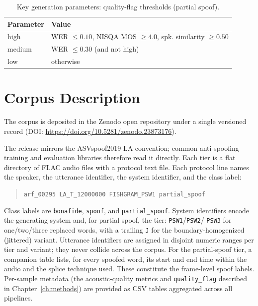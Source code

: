 \documentclass[11pt]{report}
\begin{document}
\begin{table}[H]
\centering
\caption{Key generation parameters: quality-flag thresholds (partial spoof).}
\label{tab:params-quality}
\small
\begin{tabular}{p{4.9cm}p{7.2cm}}
\toprule
\textbf{Parameter} & \textbf{Value} \\
\midrule
high & WER $\leq 0.10$, NISQA MOS $\geq 4.0$, spk. similarity $\geq 0.50$ \\
medium & WER $\leq 0.30$ (and not high) \\
low & otherwise \\
\bottomrule
\end{tabular}
\end{table}

\chapter{Corpus Description}
\label{ch:data-records}

The corpus is deposited in the Zenodo open repository
under a single versioned record (DOI: \url{https://doi.org/10.5281/zenodo.23873176}).

The release mirrors the ASVspoof2019 LA convention; common
anti-spoofing training and evaluation libraries therefore read it directly.
Each tier is a flat directory of FLAC audio files with a protocol text
file. Each protocol line names the speaker, the utterance identifier, the
system identifier, and the class label:

\begin{quote}\small
\texttt{arf\_00295\ LA\_T\_12000000\ FISHGRAM\_PSW1\ partial\_spoof}
\end{quote}

Class labels are \texttt{bonafide}, \texttt{spoof}, and
\texttt{partial\_spoof}. System identifiers encode the generating system
and, for partial spoof, the tier: \texttt{PSW1}/\texttt{PSW2}/%
\texttt{PSW3} for one/two/three replaced words, with a trailing
\texttt{J} for the boundary-homogenized (jittered) variant. Utterance
identifiers are assigned in disjoint numeric ranges per tier and
variant; they never collide across the corpus. For the partial-spoof
tier, a companion table lists, for every spoofed word, its start and end
time within the audio and the splice technique used. These constitute
the frame-level spoof labels. Per-sample metadata (the acoustic-quality
metrics and \texttt{quality\_flag} described in
Chapter~\ref{ch:methods}) are provided as CSV tables aggregated across
all pipelines.
\end{document}
